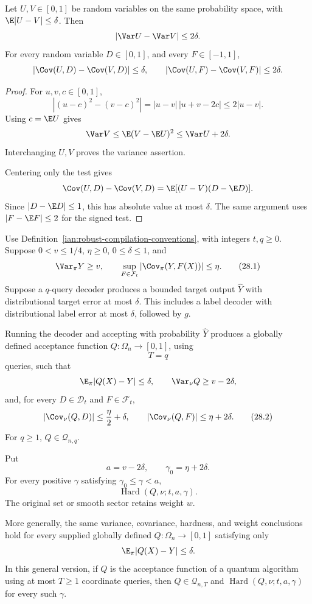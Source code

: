 \begin{lemma}
\label{ian:robust-compilation-perturbation}
Let \(U,V\in[0,1]\) be random variables on the same probability space, with
\(\E|U-V|\le\delta\). Then
\[
 |\Var U-\Var V|\le2\delta.
\]
For every random variable \(D\in[0,1]\), and every \(F\in[-1,1]\),
\[
 |\Cov(U,D)-\Cov(V,D)|\le\delta,
 \qquad
 |\Cov(U,F)-\Cov(V,F)|\le2\delta.
\]
\end{lemma}

\begin{proof}
For \(u,v,c\in[0,1]\),
\[
 |(u-c)^2-(v-c)^2|
 =|u-v|\,|u+v-2c|
 \le2|u-v|.
\]
Using \(c=\E U\) gives
\[
 \Var V
 \le\E(V-\E U)^2
 \le\Var U+2\delta.
\]
Interchanging \(U,V\) proves the variance assertion.

Centering only the test gives
\[
 \Cov(U,D)-\Cov(V,D)
 =\E[(U-V)(D-\E D)].
\]
Since \(|D-\E D|\le1\), this has absolute value at most \(\delta\).
The same argument uses \(|F-\E F|\le2\) for the signed test.
\end{proof}

\begin{theorem}
\label{ian:robust-compilation-theorem}
Use Definition~\ref{ian:robust-compilation-conventions}, with integers \(t,q\ge0\).
Suppose \(0<v\le1/4\), \(\eta\ge0\), \(0\le\delta\le1\), and
\[
 \Var_\pi Y\ge v,
 \qquad
 \sup_{F\in\mathcal F_t}
 |\Cov_\pi(Y,F(X))|\le\eta.
 \tag{28.1}\label{ian:robust-compilation-LH}
\]
Suppose a \(q\)-query decoder produces a bounded target output \(\widehat Y\) with distributional target error at most \(\delta\).
This includes a label decoder with distributional label error at most \(\delta\), followed by \(g\).

Running the decoder and accepting with probability \(\widehat Y\) produces a globally defined acceptance function \(Q:\Omega_n\to[0,1]\), using
\[
 T=q
\]
queries, such that
\[
 \E_\pi|Q(X)-Y|\le\delta,
 \qquad
 \Var_\nu Q\ge v-2\delta,
\]
and, for every \(D\in\mathcal D_t\) and \(F\in\mathcal F_t\),
\[
 |\Cov_\nu(Q,D)|\le\frac{\eta}{2}+\delta,
 \qquad
 |\Cov_\nu(Q,F)|\le\eta+2\delta.
 \tag{28.2}\label{ian:robust-compilation-LR}
\]
For \(q\ge1\), \(Q\in\mathcal Q_{n,q}\).

Put
\[
 a=v-2\delta,\qquad \gamma_0=\eta+2\delta.
\]
For every positive \(\gamma\) satisfying \(\gamma_0\le\gamma<a\),
\[
 \operatorname{Hard}(Q,\nu;t,a,\gamma).
\]
The original set or smooth sector retains weight \(w\).

More generally, the same variance, covariance, hardness, and weight conclusions hold for every supplied globally defined \(Q:\Omega_n\to[0,1]\) satisfying only
\[
 \E_\pi|Q(X)-Y|\le\delta.
\]
In this general version, if \(Q\) is the acceptance function of a quantum algorithm using at most \(T\ge1\) coordinate queries, then \(Q\in\mathcal Q_{n,T}\) and \(\operatorname{Hard}(Q,\nu;t,a,\gamma)\) for every such \(\gamma\).
\end{theorem}

